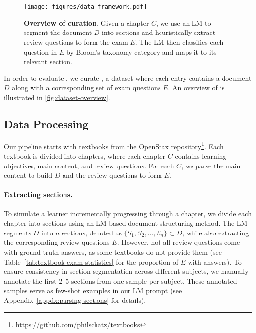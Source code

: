 \section{\ourdata}
\label{sec:textbook-exam}

\begin{figure}[t]
    \centering
    \texttt{[image: figures/data\_framework.pdf]}    \caption{\textbf{Overview of  \ourdata curation}. Given a chapter $C$, we use an LM to segment the document $D$ into sections and heuristically extract review questions to form the exam $E$. The LM then classifies each question in $E$ by Bloom’s taxonomy category and maps it to its relevant section.}
    \label{fig:dataset-overview}
    \vspace{-0.3cm}
\end{figure}

In order to evaluate \ours, we curate  \ourdata, a dataset where each entry contains a document \(D\) along with a corresponding set of exam questions \(E\).
An overview of \ourdata is illustrated in \autoref{fig:dataset-overview}.

\subsection{Data Processing}
\label{ssec:textbook-exam-pipeline}
Our pipeline starts with textbooks from the OpenStax repository\footnote{\url{https://github.com/philschatz/textbooks}}.
Each textbook is divided into chapters, where each chapter \(C\) contains learning objectives, main content, and review questions.
For each \(C\), we parse the main content to build \(D\) and the review questions to form \(E\).

\paragraph{Extracting sections.}
To simulate a learner incrementally progressing through a chapter, we divide each chapter into sections using an LM-based document structuring method. 
The LM segments \( D \) into \( n \) sections, denoted as \( \{S_1, S_2, \ldots, S_n\} \subset D \), while also extracting the corresponding review questions \( E \). 
However, not all review questions come with ground-truth answers, as some textbooks do not provide them (see Table~\ref{tab:textbook-exam-statistics} for the proportion of \( E \) with answers). 
To ensure consistency in section segmentation across different subjects, we manually annotate the first 2–5 sections from one sample per subject. 
These annotated samples serve as few-shot examples in our LM prompt (see Appendix~\ref{appdx:parsing-sections} for details).

